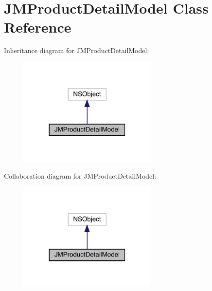 \hypertarget{interface_j_m_product_detail_model}{}\section{J\+M\+Product\+Detail\+Model Class Reference}
\label{interface_j_m_product_detail_model}


Inheritance diagram for J\+M\+Product\+Detail\+Model\+:\nopagebreak
\begin{figure}[H]
\begin{center}
\leavevmode
\includegraphics[width=197pt]{interface_j_m_product_detail_model__inherit__graph}
\end{center}
\end{figure}


Collaboration diagram for J\+M\+Product\+Detail\+Model\+:\nopagebreak
\begin{figure}[H]
\begin{center}
\leavevmode
\includegraphics[width=197pt]{interface_j_m_product_detail_model__coll__graph}
\end{center}
\end{figure}
